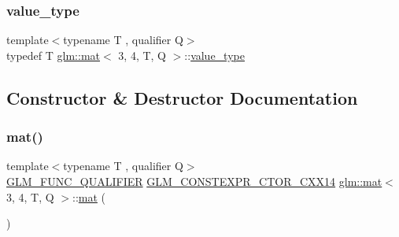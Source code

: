 \mbox{\label{structglm_1_1mat_3_013_00_014_00_01_t_00_01_q_01_4_a5fafacf57e2d28a8de693056c450088c}} 
\subsubsection{\texorpdfstring{value\+\_\+type}{value\_type}}
{\footnotesize\ttfamily template$<$typename T , qualifier Q$>$ \\
typedef T \mbox{\hyperlink{structglm_1_1mat}{glm\+::mat}}$<$ 3, 4, T, Q $>$\+::\mbox{\hyperlink{structglm_1_1mat_3_013_00_014_00_01_t_00_01_q_01_4_a5fafacf57e2d28a8de693056c450088c}{value\+\_\+type}}}



\subsection{Constructor \& Destructor Documentation}
\mbox{\label{structglm_1_1mat_3_013_00_014_00_01_t_00_01_q_01_4_ab9511e49e913947be5af4f97b0703de7}} 
\subsubsection{\texorpdfstring{mat()}{mat()}\hspace{0.1cm}{\footnotesize\ttfamily [1/21]}}
{\footnotesize\ttfamily template$<$typename T , qualifier Q$>$ \\
\mbox{\hyperlink{setup_8hpp_a33fdea6f91c5f834105f7415e2a64407}{G\+L\+M\+\_\+\+F\+U\+N\+C\+\_\+\+Q\+U\+A\+L\+I\+F\+I\+ER}} \mbox{\hyperlink{setup_8hpp_a0900f9145e68bf6061b6f5e7be3fa751}{G\+L\+M\+\_\+\+C\+O\+N\+S\+T\+E\+X\+P\+R\+\_\+\+C\+T\+O\+R\+\_\+\+C\+X\+X14}} \mbox{\hyperlink{structglm_1_1mat}{glm\+::mat}}$<$ 3, 4, T, Q $>$\+::\mbox{\hyperlink{structglm_1_1mat}{mat}} (\begin{DoxyParamCaption}{ }\end{DoxyParamCaption})}

\mbox{\label{structglm_1_1mat_3_013_00_014_00_01_t_00_01_q_01_4_a7c4d69ea49d8271382c7d08e14c16a25}} 
